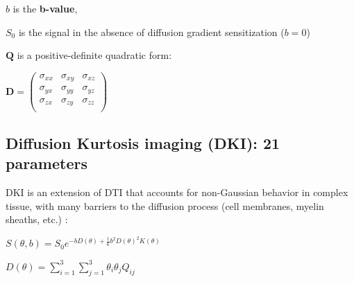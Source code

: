 \documentclass[a0, landscape]{a0poster}
\begin{document}
\begin{multicols}{3}
\noindent $b$ is the \textbf {b-value},

\noindent $S_0$ is the signal in the absence of diffusion gradient sensitization ($b=0$)

\noindent $\mathbf{Q}$ is a positive-definite quadratic form:

\vspace{2mm}
\begin{center}

$\mathbf{D} = \begin{pmatrix} \sigma_{xx} & \sigma_{xy} & \sigma_{xz} \\
                              \sigma_{yx} & \sigma_{yy} & \sigma_{yz} \\
				                      \sigma_{zx} & \sigma_{zy} & \sigma_{zz} \\
\end{pmatrix} $

\end{center}

\subsection*{Diffusion Kurtosis imaging (DKI): 21 parameters}

DKI is an extension of DTI that accounts for non-Gaussian behavior in complex tissue, with many barriers to the diffusion process (cell membranes,
myelin sheaths, etc.) \cite{Jensen2005-vr}:

\vspace{2mm}
\begin{center}
\begin{large}

$ S(\theta, b)=S_{0}e^{-bD(\theta)+\frac{1}{6}b^{2}D(\theta)^{2}K(\theta)}$

\vspace{2mm}
\end{large}
\end{center}

\vspace{2mm}
\begin{center}
\begin{large}

$D(\theta)=\sum_{i=1}^{3}\sum_{j=1}^{3}\theta_{i}\theta_{j}Q_{ij}$

\vspace{2mm}
\end{large}
\end{center}

\vspace{2mm}
\begin{center}
\begin{large}


\end{large}
\end{center}
\end{multicols}
\end{document}
